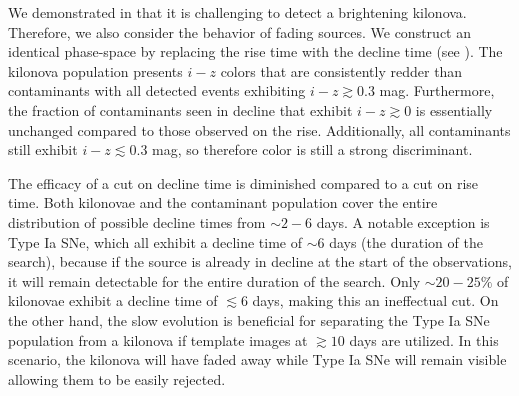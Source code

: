 We demonstrated in  that it is challenging to detect a brightening kilonova. Therefore, we also consider the behavior of fading sources. We construct an identical phase-space by replacing the rise time with the decline time (see ). The kilonova population presents $i-z$ colors that are consistently redder than contaminants with all detected events exhibiting $i-z \gtrsim 0.3$ mag. Furthermore, the fraction of contaminants seen in decline that exhibit $i-z\gtrsim0$ is essentially unchanged compared to those observed on the rise. Additionally, all contaminants still exhibit $i-z \lesssim 0.3$ mag, so therefore color is still a strong discriminant.

The efficacy of a cut on decline time is diminished compared to a cut on rise time. Both kilonovae and the contaminant population cover the entire distribution of possible decline times from $\sim2-6$ days. A notable exception is Type Ia SNe, which all exhibit a decline time of $\sim6$ days (the duration of the search), because if the source is already in decline at the start of the observations, it will remain detectable for the entire duration of the search. Only $\sim20-25\%$ of kilonovae exhibit a decline time of $\lesssim6$ days, making this an ineffectual cut. On the other hand, the slow evolution is beneficial for separating the Type Ia SNe population from a kilonova if template images at $\gtrsim 10$ days are utilized. In this scenario, the kilonova will have faded away while Type Ia SNe will remain visible allowing them to be easily rejected.

